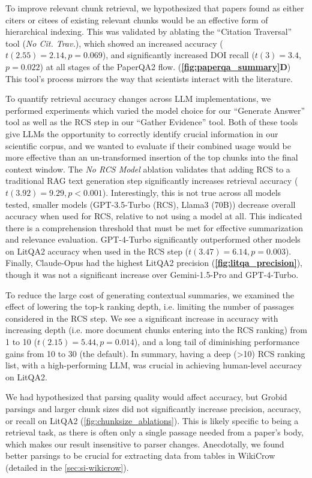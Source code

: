 \documentclass{article}
\begin{document}
\begin{bibunit}[unsrt]
To improve relevant chunk retrieval, we hypothesized that papers found as either citers or citees of existing relevant chunks would be an effective form of hierarchical indexing. This was validated by ablating the ``Citation Traversal'' tool (\textit{No Cit. Trav.}), which showed an increased accuracy ($t(2.55)=2.14, p=0.069$), and significantly increased DOI recall ($t(3)=3.4$, $p=0.022$) at all stages of the PaperQA2 flow. (\textbf{\autoref{fig:paperqa_summary}D}) This tool's process mirrors the way that scientists interact with the literature.

To quantify retrieval accuracy changes across LLM implementations, we performed experiments which varied the model choice for our ``Generate Answer'' tool as well as the RCS step in our ``Gather Evidence'' tool. Both of these tools give LLMs the opportunity to correctly identify crucial information in our scientific corpus, and we wanted to evaluate if their combined usage would be more effective than an un-transformed insertion of the top chunks into the final context window. The \textit{No RCS Model} ablation validates that adding RCS to a traditional RAG text generation step significantly increases retrieval accuracy ($t(3.92)=9.29, p < 0.001$). Interestingly, this is not true across all models tested, smaller models (GPT-3.5-Turbo (RCS), Llama3 (70B)) decrease overall accuracy when used for RCS, relative to not using a model at all. This indicated there is a comprehension threshold that must be met for effective summarization and relevance evaluation. GPT-4-Turbo significantly outperformed other models on LitQA2 accuracy when used in the RCS step ($t(3.47)=6.14, p=0.003$). Finally, Claude-Opus \cite{claude2024} had the highest LitQA2 precision (\textbf{\autoref{fig:litqa_precision}}), though it was not a significant increase over Gemini-1.5-Pro and GPT-4-Turbo.

To reduce the large cost of generating contextual summaries, we examined the effect of lowering the top-k ranking depth, i.e. limiting the number of passages considered in the RCS step. We see a significant increase in accuracy with increasing depth (i.e. more document chunks entering into the RCS ranking) from 1 to 10 ($t(2.15)=5.44, p=0.014$), and a long tail of diminishing performance gains from 10 to 30 (the default). In summary, having a deep (>10) RCS ranking list, with a high-performing LLM, was crucial in achieving human-level accuracy on LitQA2. 

We had hypothesized that parsing quality would affect accuracy, but Grobid parsings and larger chunk sizes did not significantly increase precision, accuracy, or recall on LitQA2 (\autoref{fig:chunksize_ablations}). This is likely specific to being a retrieval task, as there is often only a single passage needed from a paper's body, which makes our result insensitive to parser changes. Anecdotally, we found better parsings to be crucial for extracting data from tables in WikiCrow (detailed in the \autoref{sec:si-wikicrow}).
%


\end{bibunit}
\end{document}
